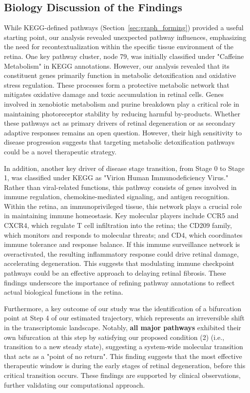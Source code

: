 \documentclass{article} %
\begin{document}
\subsection{Biology Discussion of the Findings}
While KEGG-defined pathways (Section~\ref{sec:graph_forming}) provided a useful starting point, our analysis revealed unexpected pathway influences, emphasizing the need for recontextualization within the specific tissue environment of the retina. One key pathway cluster, node 79, was initially classified under "Caffeine Metabolism" in KEGG annotations. However, our analysis revealed that its constituent genes primarily function in metabolic detoxification and oxidative stress regulation. These processes form a protective metabolic network that mitigates oxidative damage and toxic accumulation in retinal cells. Genes involved in xenobiotic metabolism and purine breakdown play a critical role in maintaining photoreceptor stability by reducing harmful by-products. Whether these pathways act as primary drivers of retinal degeneration or as secondary adaptive responses remains an open question. However, their high sensitivity to disease progression suggests that targeting metabolic detoxification pathways could be a novel therapeutic strategy.

In addition, another key driver of disease stage transition, from Stage 0 to Stage 1, was classified under KEGG as "Virion Human Immunodeficiency Virus." Rather than viral-related functions, this pathway consists of genes involved in immune regulation, chemokine-mediated signaling, and antigen recognition. Within the retina, an immunoprivileged tissue, this network plays a crucial role in maintaining immune homeostasis. Key molecular players include CCR5 and CXCR4, which regulate T cell infiltration into the retina; the CD209 family, which monitors and responds to molecular threats; and CD4, which coordinates immune tolerance and response balance. If this immune surveillance network is overactivated, the resulting inflammatory response could drive retinal damage, accelerating degeneration. This suggests that modulating immune checkpoint pathways could be an effective approach to delaying retinal fibrosis. These findings underscore the importance of refining pathway annotations to reflect actual biological functions in the retina.

Furthermore, a key outcome of our study was the identification of a bifurcation point at Step 4 of our estimated trajectory, which represents an irreversible shift in the transcriptomic landscape. Notably, \textbf{all major pathways} exhibited their own bifurcation at this step by satisfying our proposed condition (2) (i.e., transition to a new steady state), suggesting a system-wide molecular transition that acts as a "point of no return". This finding suggests that the most effective therapeutic window is during the early stages of retinal degeneration, before this critical transition occurs. These findings are supported by clinical observations, further validating our computational approach.
\end{document}
